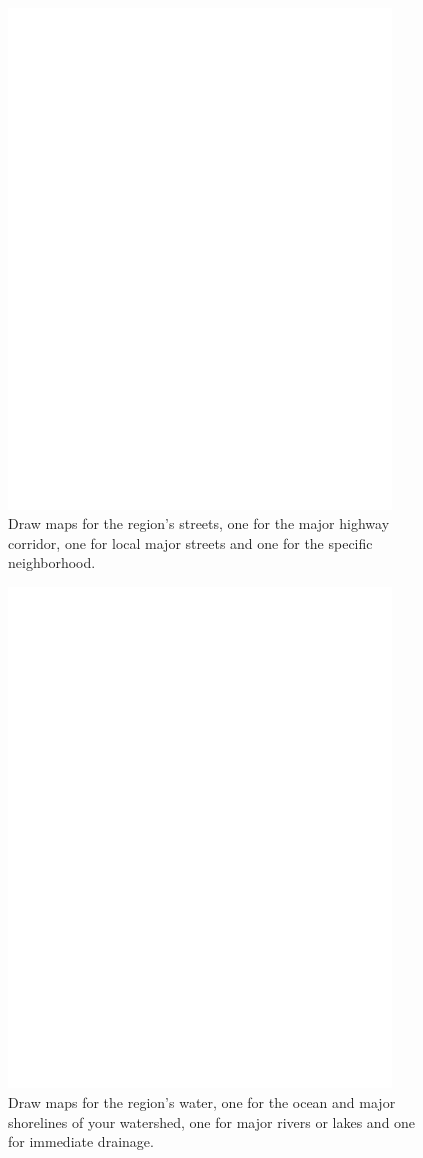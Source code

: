 
 \begin{figure}
	\centering
	\includegraphics[width=4in]{imageserver/uploadimages/image3.png}
	\caption[streetmaps]
	{Draw maps for the region's streets, one for the major highway corridor, one for local major streets and one for the specific neighborhood.}
\end{figure}

 \begin{figure}
	\centering
	\includegraphics[width=4in]{imageserver/uploadimages/image3.png}
	\caption[watermaps]
	{Draw maps for the region's water, one for the ocean and major shorelines of your watershed, one for major rivers or lakes and one for immediate drainage.}
\end{figure}

